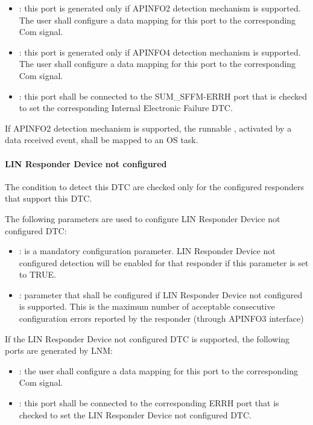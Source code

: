 \begin{itemize}
\item {}: this port is generated only if APINFO2 detection mechanism is supported. The user shall configure a data mapping for this port to the corresponding Com signal.
\item {}: this port is generated only if APINFO4 detection mechanism is supported. The user shall configure a data mapping for this port to the corresponding Com signal.
\item {}: this port shall be connected to the SUM\_SFFM-ERRH port that is checked to set the corresponding Internal Electronic Failure DTC.
\end{itemize}


If APINFO2 detection mechanism is supported, the runnable , activated by a data received event, shall be mapped to an OS task.


\paragraph{LIN Responder Device not configured}
The condition to detect this DTC are checked only for the configured responders that support this DTC.


The following parameters are used to configure LIN Responder Device not configured DTC:
\begin{itemize}
\item {}: is a mandatory configuration parameter. LIN Responder Device not configured detection will be enabled for that responder if this parameter is set to TRUE.
\item {}: parameter that shall be configured if LIN Responder Device not configured is supported. This is the maximum number of acceptable consecutive configuration errors reported by the responder (through APINFO3 interface)
\end{itemize}

If the LIN Responder Device not configured DTC is supported, the following ports are generated by LNM:
\begin{itemize}
\item {}: the user shall configure a data mapping for this port to the corresponding Com signal.
\item {}: this port shall be connected to the corresponding ERRH port that is checked to set the LIN Responder Device not configured DTC.
\end{itemize}

